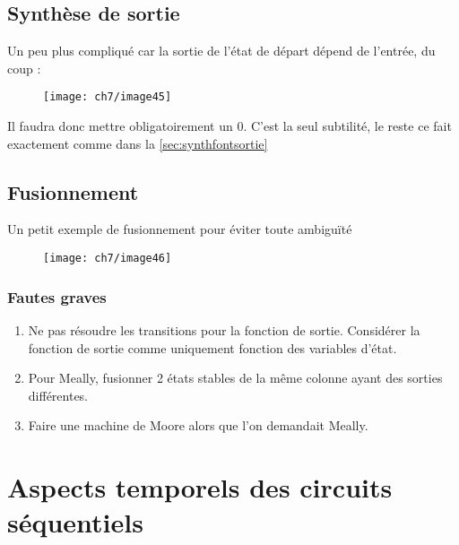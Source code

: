 \subsection{Synthèse de sortie}
Un peu plus compliqué car la sortie de l'état de départ dépend de l'entrée, du coup :
\begin{figure}[H]
	\centering
	\texttt{[image: ch7/image45]}
\end{figure}
Il faudra donc mettre obligatoirement un 0. C'est la seul subtilité, le reste ce fait exactement comme dans la \autoref{sec:synthfontsortie}
\subsection{Fusionnement}
Un petit exemple de fusionnement pour éviter toute ambiguïté
\begin{figure}[H]
	\centering
	\texttt{[image: ch7/image46]}
\end{figure}
\subsubsection{Fautes graves}
\begin{enumerate}
	\item Ne pas résoudre les transitions pour la fonction de sortie. Considérer la fonction de sortie comme uniquement fonction des variables d'état.
	\item Pour Meally, fusionner 2 états stables de la même colonne ayant des sorties différentes.
	\item  Faire une machine de Moore alors que l'on demandait Meally.
\end{enumerate}
\section{Aspects temporels des circuits séquentiels}
